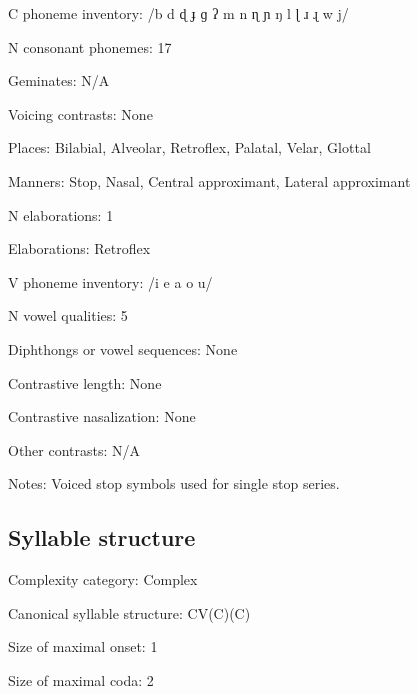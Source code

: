 {\begin{appendixdesc}
\item[C phoneme inventory:] /b d ɖ ɟ ɡ ʔ m n ɳ ɲ ŋ l ɭ ɹ ɻ w j/

\item[N consonant phonemes:] 17

\item[Geminates:] N/A

\item[Voicing contrasts:] None

\item[Places:] Bilabial, Alveolar, Retroflex, Palatal, Velar, Glottal

\item[Manners:] Stop, Nasal, Central approximant, Lateral approximant

\item[N elaborations:] 1

\item[Elaborations:] Retroflex

\item[V phoneme inventory:] /i e a o u/

\item[N vowel qualities:] 5

\item[Diphthongs or vowel sequences:] None

\item[Contrastive length:] None

\item[Contrastive nasalization:] None

\item[Other contrasts:] N/A

\item[Notes:] Voiced stop symbols used for single stop series.
\end{appendixdesc}
\subsection*{Syllable structure}
\begin{appendixdesc}

\item[Complexity category:] Complex

\item[Canonical syllable structure:] CV(C)(C) \citep[186--196]{Merlan1989}

\item[Size of maximal onset:] 1

\item[Size of maximal coda:] 2


\end{appendixdesc}}
